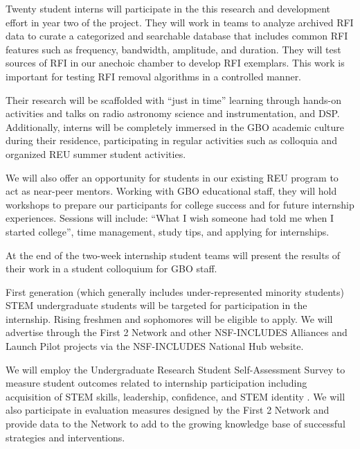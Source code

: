 \documentclass[10pt]{myNSF}
\begin{document}
 Twenty student interns will
participate in the this research and development effort in year two of
the project.  They will work in teams to analyze archived RFI data to
curate a categorized and searchable database that includes common RFI
features such as frequency, bandwidth, amplitude, and duration.  They
will test sources of RFI in our anechoic chamber to develop RFI
exemplars. This work is important for testing RFI removal algorithms
in a controlled manner.

Their research will be scaffolded with ``just in time'' learning
through hands-on activities and talks on radio astronomy science and
instrumentation, and DSP.  Additionally, interns will be completely
immersed in the GBO academic culture during their residence,
participating in regular activities such as colloquia and organized
REU summer student activities.

We will also offer an opportunity for students in our existing REU
program to act as near-peer mentors. Working with GBO educational
staff, they will hold workshops to prepare our participants for
college success and for future internship experiences. Sessions will
include: ``What I wish someone had told me when I started college'',
time management, study tips, and applying for internships.

At the end of the two-week internship student teams will present the
results of their work in a student colloquium for GBO staff.

 First generation
(which generally includes under-represented minority students) STEM
undergraduate students will be targeted for participation in the
internship. Rising freshmen and sophomores will be eligible to apply.
We will advertise through the First 2 Network and other NSF-INCLUDES
Alliances and Launch Pilot projects via the NSF-INCLUDES National Hub
website.

 We will employ the Undergraduate Research
Student Self-Assessment Survey to measure student outcomes related to
internship participation including acquisition of STEM skills,
leadership, confidence, and STEM identity \cite{wld15}. We will also
participate in evaluation measures designed by the First 2 Network and
provide data to the Network to add to the growing knowledge base of
successful strategies and interventions.

\label{sec:summer_student}
\end{document}
